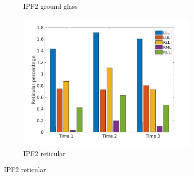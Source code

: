 \begin{figure}[H]
\begin{subfigure}{.46\linewidth}
  \caption{IPF2 ground-glass}
  \label{fig:IPF2LobarRegionDiseaseDistributionOverTime-a} 
\end{subfigure} 
\hspace{.3in}
\begin{subfigure}{.46\linewidth}%
  \includegraphics[width=\linewidth,trim={{.0\wd0} {.0\wd0} {.0\wd0} {.0\wd0}},clip]{Appendix/Image_AppexA/LobarDistribution/IPF2ReticularLobarRegionDiseaseDistributionOverTime.jpg}
  \caption{IPF2 reticular}
  \label{fig:IPF2LobarRegionDiseaseDistributionOverTime-b}
\end{subfigure}

\end{figure}
